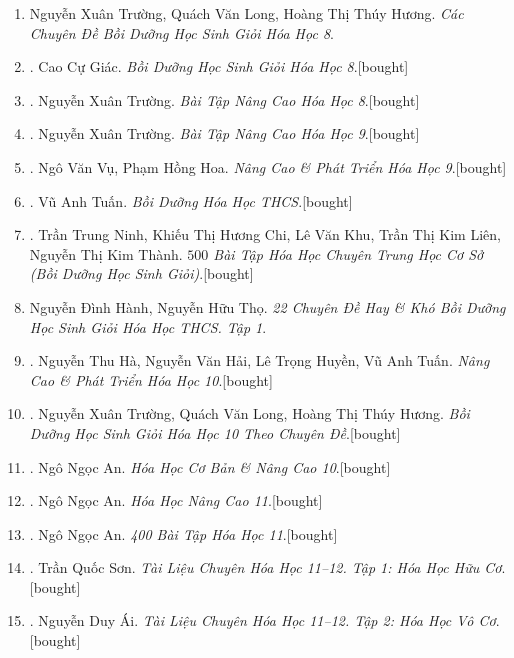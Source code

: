 \documentclass{article}
\begin{document}
\begin{enumerate}
	\item Nguyễn Xuân Trường, Quách Văn Long, Hoàng Thị Thúy Hương. \textit{Các Chuyên Đề Bồi Dưỡng Học Sinh Giỏi Hóa Học 8}.
	\item \cite{Giac2021}. Cao Cự Giác. \textit{Bồi Dưỡng Học Sinh Giỏi Hóa Học 8}.\hfill\textsf{[bought]}
	\item \cite{Truong_BTNC_Hoa_Hoc_8_2022}. Nguyễn Xuân Trường. \textit{Bài Tập Nâng Cao Hóa Học 8}.\hfill\textsf{[bought]}
	\item \cite{Truong_BTNC_Hoa_Hoc_9_2021}. Nguyễn Xuân Trường. \textit{Bài Tập Nâng Cao Hóa Học 9}.\hfill\textsf{[bought]}
	\item \cite{Vu_Hoa2021}. Ngô Văn Vụ, Phạm Hồng Hoa. \textit{Nâng Cao \& Phát Triển Hóa Học 9}.\hfill\textsf{[bought]}
	\item \cite{Tuan2022}. Vũ Anh Tuấn. \textit{Bồi Dưỡng Hóa Học THCS}.\hfill\textsf{[bought]}
	\item \cite{Ninh_Chi_Khu_Lien_Thanh2019}. Trần Trung Ninh, Khiếu Thị Hương Chi, Lê Văn Khu, Trần Thị Kim Liên, Nguyễn Thị Kim Thành. \textit{$500$ Bài Tập Hóa Học Chuyên Trung Học Cơ Sở (Bồi Dưỡng Học Sinh Giỏi)}.\hfill\textsf{[bought]}
	\item Nguyễn Đình Hành, Nguyễn Hữu Thọ. \textit{22 Chuyên Đề Hay \& Khó Bồi Dưỡng Học Sinh Giỏi Hóa Học THCS. Tập 1}.
	\item \cite{Ha_Hai_Huyen_Tuan2022}. Nguyễn Thu Hà, Nguyễn Văn Hải, Lê Trọng Huyền, Vũ Anh Tuấn. \textit{Nâng Cao \& Phát Triển Hóa Học 10}.\hfill\textsf{[bought]}
	\item \cite{Truong_Long_Huong2022}. Nguyễn Xuân Trường, Quách Văn Long, Hoàng Thị Thúy Hương. \textit{Bồi Dưỡng Học Sinh Giỏi Hóa Học 10 Theo Chuyên Đề}.\hfill\textsf{[bought]}
	\item \cite{An_Hoa_Hoc_co_ban_nang_cao_10_2020}. Ngô Ngọc An. \textit{Hóa Học Cơ Bản \& Nâng Cao 10}.\hfill\textsf{[bought]}
	\item \cite{An_Hoa_Hoc_nang_cao_11_2020}. Ngô Ngọc An. \textit{Hóa Học Nâng Cao 11}.\hfill\textsf{[bought]}
	\item \cite{An_400_BT_Hoa_Hoc_11_2021}. Ngô Ngọc An. \textit{400 Bài Tập Hóa Học 11}.\hfill\textsf{[bought]}
	\item \cite{Son2021}. Trần Quốc Sơn. \textit{Tài Liệu Chuyên Hóa Học 11--12. Tập 1: Hóa Học Hữu Cơ}.\hfill\textsf{[bought]}
	\item \cite{Ai2022}. Nguyễn Duy Ái. \textit{Tài Liệu Chuyên Hóa Học 11--12. Tập 2: Hóa Học Vô Cơ}.\hfill\textsf{[bought]}

\end{enumerate}
\end{document}
